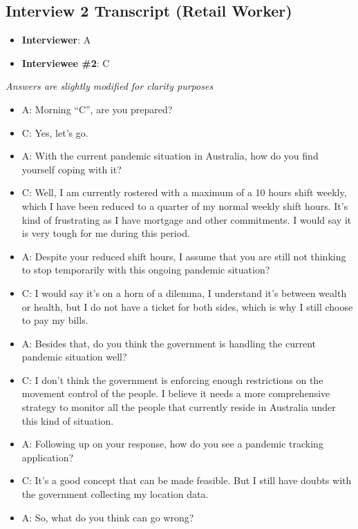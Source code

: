 \begin{appendices}
      \subsection{Interview 2 Transcript (Retail Worker)}
      \begin{itemize}
        \item \textbf{Interviewer}: A
        \item \textbf{Interviewee \#2}: C
      \end{itemize}
      \par \textit{Answers are slightly modified for clarity purposes}

      \begin{itemize}
        \item A: Morning “C”, are you prepared?
        \item C: Yes, let’s go.
        \item A: With the current pandemic situation in Australia, how do you find yourself coping with it?
        \item C: Well, I am currently rostered with a maximum of a 10 hours shift weekly, which I have been
        reduced to a quarter of my normal weekly shift hours. It’s kind of frustrating as I have
        mortgage and other commitments. I would say it is very tough for me during this period.
        \item A: Despite your reduced shift hours, I assume that you are still not thinking to stop temporarily
        with this ongoing pandemic situation?
        \item C: I would say it’s on a horn of a dilemma, I understand it’s between wealth or health, but I do
        not have a ticket for both sides, which is why I still choose to pay my bills.
        \item A: Besides that, do you think the government is handling the current pandemic situation well?
        \item C: I don’t think the government is enforcing enough restrictions on the movement control of the
        people. I believe it needs a more comprehensive strategy to monitor all the people that
        currently reside in Australia under this kind of situation.
        \item A: Following up on your response, how do you see a pandemic tracking application?
        \item C: It’s a good concept that can be made feasible. But I still have doubts with the government
        collecting my location data.
        \item A: So, what do you think can go wrong?

\end{itemize}
\end{appendices}
